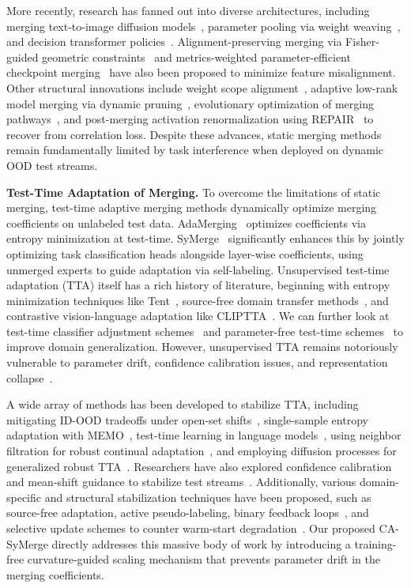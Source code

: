 \documentclass{article}
\begin{document}
More recently, research has fanned out into diverse architectures, including merging text-to-image diffusion models~\cite{biggs2024}, parameter pooling via weight weaving~\cite{chaves2025}, and decision transformer policies~\cite{lawson2023}. Alignment-preserving merging via Fisher-guided geometric constraints~\cite{roy2025, matena2022} and metrics-weighted parameter-efficient checkpoint merging~\cite{yu2025} have also been proposed to minimize feature misalignment. Other structural innovations include weight scope alignment~\cite{xu2024, maldonado2024, lawson2023, jin2020}, adaptive low-rank model merging via dynamic pruning~\cite{marczak2024}, evolutionary optimization of merging pathways~\cite{akiba2024}, and post-merging activation renormalization using REPAIR~\cite{jordan2024} to recover from correlation loss. Despite these advances, static merging methods remain fundamentally limited by task interference when deployed on dynamic OOD test streams.

\textbf{Test-Time Adaptation of Merging.} To overcome the limitations of static merging, test-time adaptive merging methods dynamically optimize merging coefficients on unlabeled test data. AdaMerging~\cite{yang24} optimizes coefficients via entropy minimization at test-time. SyMerge~\cite{jung24} significantly enhances this by jointly optimizing task classification heads alongside layer-wise coefficients, using unmerged experts to guide adaptation via self-labeling. Unsupervised test-time adaptation (TTA) itself has a rich history of literature, beginning with entropy minimization techniques like Tent~\cite{wang2021tent}, source-free domain transfer methods~\cite{liang2020}, and contrastive vision-language adaptation like CLIPTTA~\cite{lafon2025}. We can further look at test-time classifier adjustment schemes~\cite{iwasawa2021} and parameter-free test-time schemes~\cite{boudiaf2022} to improve domain generalization. However, unsupervised TTA remains notoriously vulnerable to parameter drift, confidence calibration issues, and representation collapse~\cite{song23, zhou2025, chen2025}. 

A wide array of methods has been developed to stabilize TTA, including mitigating ID-OOD tradeoffs under open-set shifts~\cite{zhao2026, lafon2025, chen2025}, single-sample entropy adaptation with MEMO~\cite{zhang2022memo}, test-time learning in language models~\cite{lin2024}, using neighbor filtration for robust continual adaptation~\cite{rafi2025, tsai2024, seo2025}, and employing diffusion processes for generalized robust TTA~\cite{han2025, zhou2025, wang2021tent, niu2022}. Researchers have also explored confidence calibration and mean-shift guidance to stabilize test streams~\cite{seo2025, zhou2025}. Additionally, various domain-specific and structural stabilization techniques have been proposed, such as source-free adaptation, active pseudo-labeling, binary feedback loops~\cite{zhao2024}, and selective update schemes to counter warm-start degradation~\cite{ash2020, zhao2026, rafi2025, tsai2024}. Our proposed CA-SyMerge directly addresses this massive body of work by introducing a training-free curvature-guided scaling mechanism that prevents parameter drift in the merging coefficients.
\end{document}
